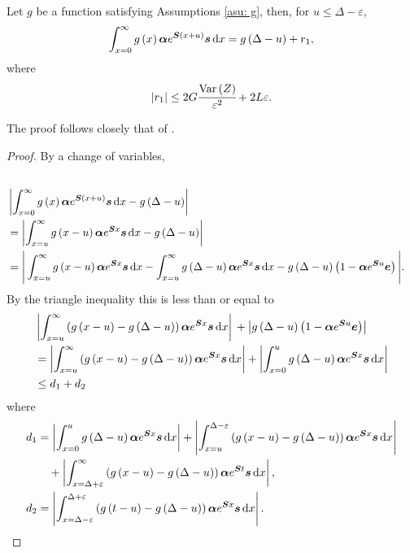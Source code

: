 \begin{lem}\label{lemma:bound}
	Let \(g\) be a function satisfying Assumptions \ref{asu: g}, then, for \(u \leq \Delta - \varepsilon\), 
	\begin{align*}
		\int_{x=0}^\infty g\left(x\right)\boldsymbol \alpha e^{\boldsymbol{S}\left(x+u\right)} \boldsymbol s \, \mathrm{d} x = g\left(\Delta-u\right) + r_1,
	\end{align*}
	where 
	\[\left|r_1\right|\leq 2G\cfrac{\mathrm{Var} \left(Z\right)}{\varepsilon^2} + 2L\varepsilon.\]
\end{lem}
The proof follows closely that of \cite[Appendix A, Theorem 4]{hhat2020}.
\begin{proof}
	By a change of variables, 
	\begin{align*}
		\\&\left|\int_{x=0}^\infty g\left(x\right)\boldsymbol \alpha  e^{\boldsymbol{S} \left(x+u\right)} \boldsymbol s \, \mathrm{d} x - g\left(\Delta-u\right)\right| 
		\\&= \left|\int_{x=u}^\infty g\left(x-u\right)\boldsymbol \alpha  e^{\boldsymbol{S} x} \boldsymbol s \, \mathrm{d} x - g\left(\Delta-u\right)\right| 
		\\&= \Bigg|\int_{x=u}^\infty g\left(x-u\right)\boldsymbol \alpha  e^{\boldsymbol{S} x} \boldsymbol s \, \mathrm{d} x - \int_{x=u}^\infty g\left(\Delta-u\right)\boldsymbol\alpha  e^{\boldsymbol{S} x}\boldsymbol s\, \mathrm{d} x - g\left(\Delta-u\right)\left(1-\boldsymbol\alpha  e^{\boldsymbol{S} u}\boldsymbol e \right)\Bigg|.
	\end{align*}
	{By the triangle inequality this is less than or equal to}
	\begin{align*}
		&\left|\int_{x=u}^\infty \left(g\left(x-u\right)- g\left(\Delta-u\right)\right)\boldsymbol \alpha  e^{\boldsymbol{S} x} \boldsymbol s \, \mathrm{d} x \right| 
		{}+ \left|g\left(\Delta-u\right)\left(1-\boldsymbol\alpha  e^{\boldsymbol{S} u}\boldsymbol e \right)\right|
		\\&= \left|\int_{x=u}^\infty \left(g\left(x-u\right)- g\left(\Delta-u\right)\right)\boldsymbol \alpha  e^{\boldsymbol{S} x} \boldsymbol s \, \mathrm{d} x\right| 
		+ \left|\int_{x=0}^u g\left(\Delta-u\right)\boldsymbol \alpha  e^{\boldsymbol{S} x} \boldsymbol s \, \mathrm{d} x \right| 
		\\&\leq d_1 +{d_2} 
	\end{align*}
	where 
	\begin{align*}
		d_1 &= \left|\int_{x=0}^u g\left(\Delta-u\right)\boldsymbol \alpha  e^{\boldsymbol{S} x} \boldsymbol s \, \mathrm{d} x\right| + \left|\int_{x=u}^{\Delta-\varepsilon } \left(g\left(x-u\right)- g\left(\Delta-u\right)\right)\boldsymbol \alpha  e^{\boldsymbol{S} x} \boldsymbol s \, \mathrm{d} x \right| 
		\\&\quad{}+ \left|\int_{x=\Delta+\varepsilon }^{\infty} \left(g\left(x-u\right)- g\left(\Delta-u\right)\right)\boldsymbol \alpha  e^{\boldsymbol{S} t} \boldsymbol s \, \mathrm{d} x \right|,
	\\{d_2} &= \left|\int_{x=\Delta-\varepsilon }^{\Delta+\varepsilon } \left(g\left(t-u\right)- g\left(\Delta-u\right)\right)\boldsymbol \alpha  e^{\boldsymbol{S} x} \boldsymbol s \, \mathrm{d} x\right| .
	\end{align*}
	

\end{proof}
